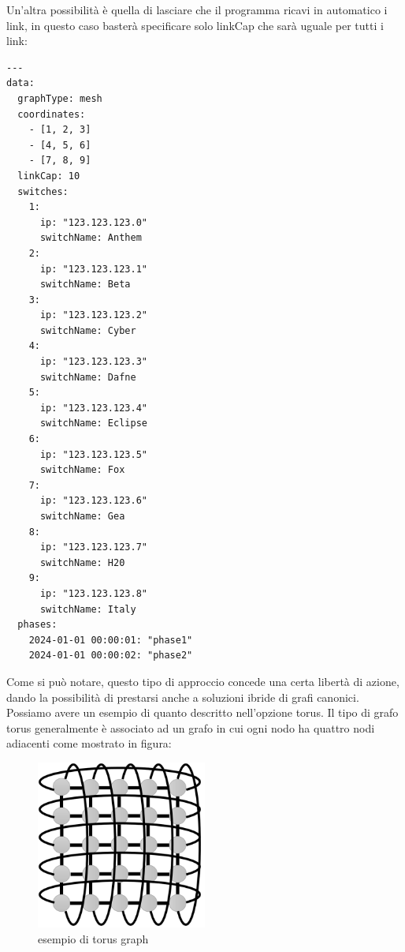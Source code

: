 \documentclass[binding=0.6cm]{sapthesis}
\begin{document}
Un'altra possibilità è quella di lasciare che il programma ricavi in automatico i link, 
in questo caso basterà specificare solo linkCap che sarà uguale per tutti i link:

{\scriptsize %
\begin{lstlisting}[caption={esempio di custom graph file con link di eguale capacità}]
    ---
data:
  graphType: mesh
  coordinates:
    - [1, 2, 3]
    - [4, 5, 6]
    - [7, 8, 9]
  linkCap: 10
  switches:
    1:
      ip: "123.123.123.0"
      switchName: Anthem
    2:
      ip: "123.123.123.1"
      switchName: Beta
    3:
      ip: "123.123.123.2"
      switchName: Cyber
    4:
      ip: "123.123.123.3"
      switchName: Dafne
    5:
      ip: "123.123.123.4"
      switchName: Eclipse
    6:
      ip: "123.123.123.5"
      switchName: Fox
    7:
      ip: "123.123.123.6"
      switchName: Gea
    8:
      ip: "123.123.123.7"
      switchName: H20
    9:
      ip: "123.123.123.8"
      switchName: Italy
  phases:
    2024-01-01 00:00:01: "phase1"
    2024-01-01 00:00:02: "phase2"
\end{lstlisting}
}

Come si può notare, questo tipo di approccio concede una certa libertà di azione, dando la possibilità
di prestarsi anche a soluzioni ibride di grafi canonici. Possiamo avere un esempio di quanto descritto
nell'opzione torus. Il tipo di grafo torus generalmente è associato ad un grafo in cui ogni nodo
ha quattro nodi adiacenti come mostrato in figura:

\begin{figure}[h]
    \centering
    \includegraphics[width=0.5\textwidth]{immagini/torus_graph.png}
    \caption{esempio di torus graph \cite{torusgraph}}
    \label{fig:torus_graph}
\end{figure}
\end{document}
